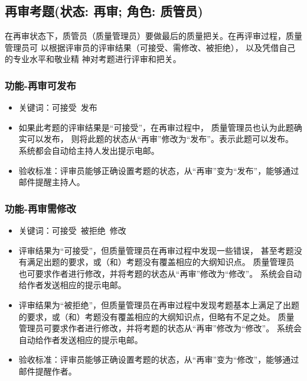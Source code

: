 \documentclass[hyperref, a4paper]{ctexart}
\providecommand{\tightlist}{%
  \setlength{\itemsep}{0pt}\setlength{\parskip}{0pt}}
\begin{document}
\hypertarget{ux518dux5ba1ux8003ux9898ux72b6ux6001-ux518dux5ba1-ux89d2ux8272-ux8d28ux7ba1ux5458}{%
\subsection{再审考题(状态: 再审; 角色:
质管员)}\label{ux518dux5ba1ux8003ux9898ux72b6ux6001-ux518dux5ba1-ux89d2ux8272-ux8d28ux7ba1ux5458}}

在再审状态下，质管员（质量管理员）要做最后的质量把关。在再评审过程，质量管理员可
以根据评审员的评审结果（可接受、需修改、被拒绝），
以及凭借自己的专业水平和敬业精 神对考题进行评审和把关。

\hypertarget{ux529fux80fd-ux518dux5ba1ux53efux53d1ux5e03}{%
\subsubsection{功能-再审可发布}\label{ux529fux80fd-ux518dux5ba1ux53efux53d1ux5e03}}

\begin{itemize}
\tightlist
\item
  关键词：可接受~发布
\item
  如果此考题的评审结果是``可接受''，在再审过程中，
  质量管理员也认为此题确实可以发布，
  则将此题的状态从``再审''修改为``发布''。表示此题可以发布。
  系统都会自动给主持人发出提示电邮。
\item
  验收标准：评审员能够正确设置考题的状态，从``再审''变为``发布''，能够通过邮件提醒主持人。
\end{itemize}

\hypertarget{ux529fux80fd-ux518dux5ba1ux9700ux4feeux6539}{%
\subsubsection{功能-再审需修改}\label{ux529fux80fd-ux518dux5ba1ux9700ux4feeux6539}}

\begin{itemize}
\tightlist
\item
  关键词：可接受~被拒绝~修改
\item
  评审结果为``可接受''，但质量管理员在再审过程中发现一些错误，
  甚至考题没有满足出题的要求，或（和）考题没有覆盖相应的大纲知识点。
  质量管理员也可要求作者进行修改，并将考题的状态从``再审''修改为``修改''。
  系统会自动给作者发送相应的提示电邮。
\item
  评审结果为``被拒绝''，但质量管理员在再审过程中发现考题基本上满足了出题的要求，或（和）考题没有覆盖相应的大纲知识点，但略有不足之处。
  质量管理员可要求作者进行修改，并将考题的状态从``再审''修改为``修改''。
  系统会自动给作者发送相应的提示电邮。
\item
  验收标准：评审员能够正确设置考题的状态，从``再审''变为``修改''，能够通过邮件提醒作者。
\end{itemize}
\end{document}
